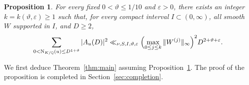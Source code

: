\documentclass[11pt,a4paper]{article}
\numberwithin{equation}{section}
\numberwithin{figure}{section}
\newtheorem{proposition}[theorem]{Proposition}
\theoremstyle{definition}
\theoremstyle{remark}
\newcommand{\Q}{\mathbb Q}
\newcommand{\NK}{\mathrm N_{K/\Q}}
\begin{document}
\begin{proposition}\label{thm:ms}
For every fixed $0<\vartheta\le1/10$ and $\varepsilon>0$, there exists an integer $k=k(\vartheta,\varepsilon)\ge1$
such that, for every compact interval $I\subset(0,\infty)$,
all smooth $W$ supported in $I$, and $D\ge2$,
\begin{equation}\label{eq:ms}
 \sum_{0<\NK(u)\le D^{1+\vartheta}}|A_u(D)|^2
       \ll_{\nu,S,I,\vartheta,\varepsilon}
       \Bigl(\max_{0\le j\le k}\|W^{(j)}\|_\infty\Bigr)^2
       D^{2+\vartheta+\varepsilon}.
\end{equation}
\end{proposition}

We first deduce Theorem~\ref{thm:main} assuming Proposition~\ref{thm:ms}.
The proof of the proposition is completed in Section~\ref{sec:completion}.
\end{document}
